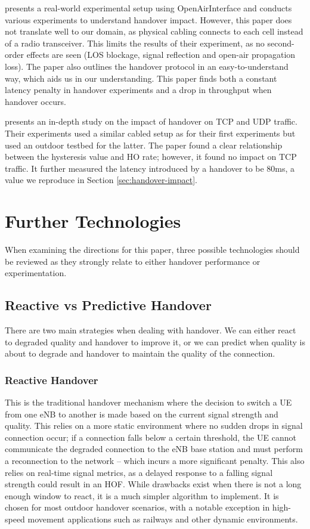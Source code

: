 \citet{bertolini_evaluating_2021} presents a real-world experimental setup using OpenAirInterface and conducts various experiments to understand handover impact. However, this paper does not translate well to our domain, as physical cabling connects to each cell instead of a radio transceiver. This limits the results of their experiment, as no second-order effects are seen (LOS blockage, signal reflection and open-air propagation loss). The paper also outlines the handover protocol in an easy-to-understand way, which aids us in our understanding. This paper finds both a constant latency penalty in handover experiments and a drop in throughput when handover occurs.

\citet{zhang_performance_2012} presents an in-depth study on the impact of handover on TCP and UDP traffic. Their experiments used a similar cabled setup as \citep{bertolini_evaluating_2021} for their first experiments but used an outdoor testbed for the latter. The paper found a clear relationship between the hysteresis value and HO rate; however, it found no impact on TCP traffic. It further measured the latency introduced by a handover to be 80ms, a value we reproduce in Section \ref{sec:handover-impact}.

\section{Further Technologies}
When examining the directions for this paper, three possible technologies should be reviewed as they strongly relate to either handover performance or experimentation. 

\subsection{Reactive vs Predictive Handover}
There are two main strategies when dealing with handover. We can either react to degraded quality and handover to improve it, or we can predict when quality is about to degrade and handover to maintain the quality of the connection.

\subsubsection*{Reactive Handover} This is the traditional handover mechanism where the decision to switch a UE from one eNB to another is made based on the current signal strength and quality. This relies on a more static environment where no sudden drops in signal connection occur; if a connection falls below a certain threshold, the UE cannot communicate the degraded connection to the eNB base station and must perform a reconnection to the network -- which incurs a more significant penalty. This also relies on real-time signal metrics, as a delayed response to a falling signal strength could result in an HOF. While drawbacks exist when there is not a long enough window to react, it is a much simpler algorithm to implement. It is chosen for most outdoor handover scenarios, with a notable exception in high-speed movement applications such as railways \cite{kosmopoulos_handover_2022} and other dynamic environments.
                
